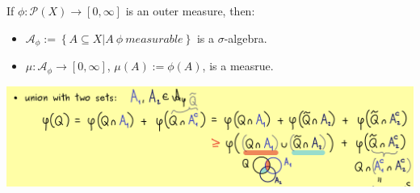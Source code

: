 \documentclass[../../note.tex]{subfiles}
\begin{document}
\begin{proposition}
    If $\phi: \mathcal{P}(X) \rightarrow [0,\infty]$ is an outer measure, then: 
    \begin{itemize}
        \item $\mathcal{A}_{\phi}:= \left\{A \subseteq X \vert A~\phi~measurable \right\}$ is a $\sigma$-algebra.
        \item $\mu: \mathcal{A}_{\phi} \rightarrow [0,\infty]$, $\mu(A) := \phi(A)$, is a measrue.
    \end{itemize}
\end{proposition}
\includegraphics[scale=0.3]{../figures/pf trick of union case.png}
\end{document}
